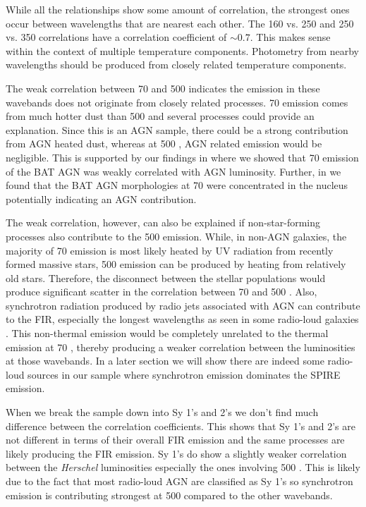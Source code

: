 While all the relationships show some amount of correlation, the strongest ones occur between wavelengths that are nearest each other. The 160 vs. 250 \um{} and 250 vs. 350 \um{} correlations have a correlation coefficient of $\sim0.7$. This makes sense within the context of multiple temperature components. Photometry from nearby wavelengths should be produced from closely related temperature components.

The weak correlation between 70 and 500 \um{} indicates the emission in these wavebands does not originate from closely related processes. 70 \um{} emission comes from much hotter dust than 500 \um{} and several processes could provide an explanation. Since this is an AGN sample, there could be a strong contribution from AGN heated dust, whereas at 500 \um{}, AGN related emission would be negligible. This is supported by our findings in \citet{Melendez:2014yu} where we showed that 70 \um{} emission of the BAT AGN was weakly correlated with AGN luminosity. Further, in \citep{Mushotzky:2014ad} we found that the BAT AGN morphologies at 70 \um{} were concentrated in the nucleus potentially indicating an AGN contribution.

The weak correlation, however, can also be explained if non-star-forming processes also contribute to the 500 \um{} emission. While, in non-AGN galaxies, the majority of 70 \um{} emission is most likely heated by UV radiation from recently formed massive stars, 500 \um{} emission can be produced by heating from relatively old stars. Therefore, the disconnect between the stellar populations would produce significant scatter in the correlation between 70 and 500 \um. Also, synchrotron radiation produced by radio jets associated with AGN can contribute to the FIR, especially the longest wavelengths as seen in some radio-loud galaxies \citep{Baes:2010ek,Boselli:2010fr}. This non-thermal emission would be completely unrelated to the thermal emission at 70 \um, thereby producing a weaker correlation between the luminosities at those wavebands. In a later section we will show there are indeed some radio-loud sources in our sample where synchrotron emission dominates the SPIRE emission. 

When we break the sample down into Sy 1's and 2's we don't find much difference between the correlation coefficients. This shows that Sy 1's and 2's are not different in terms of their overall FIR emission and the same processes are likely producing the FIR emission. Sy 1's do show a slightly weaker correlation between the \textit{Herschel} luminosities especially the ones involving 500 \um. This is likely due to the fact that most radio-loud AGN are classified as Sy 1's so synchrotron emission is contributing strongest at 500 \um{} compared to the other wavebands.